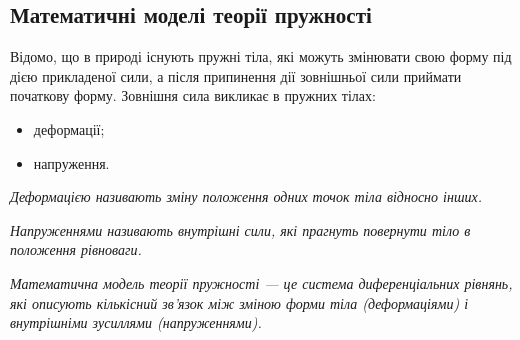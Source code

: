 % 


% 

% 



\subsection{Математичні моделі теорії пружності}

Відомо, що в природі існують пружні тіла, які можуть змінювати свою форму під дією прикладеної сили, а після припинення дії зовнішньої сили приймати початкову форму. Зовнішня сила викликає в пружних тілах:
\begin{itemize}
	\item деформації;
	\item напруження.
\end{itemize}

\begin{definition}[деформації]
	\it{Деформацією} називають зміну положення одних точок тіла відносно інших.
\end{definition}

\begin{definition}[напружень]
	\it{Напруженнями} називають внутрішні сили, які прагнуть повернути тіло в положення рівноваги.
\end{definition}

\begin{definition}
	\it{Математична модель теорії пружності} --- це система диференціальних рівнянь, які описують кількісний зв'язок між зміною форми тіла (деформаціями) і внутрішніми зусиллями (напруженнями). 
\end{definition}

